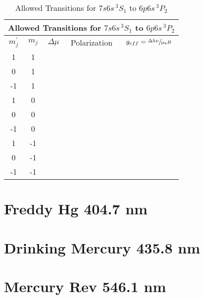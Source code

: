 \documentclass{article}
\begin{document}
\begin{table}[H]
\begin{center}
\begin{tabular}{|c|c|c|c|c|}
\hline
\multicolumn{5}{|c|}{Allowed Transitions for $7s6s\,^3S_1$ to $6p6s\,^3P_2$} \\
\hline 
$m_j^{\prime}$ & $m_j$ & $\Delta\mu$ & Polarization & $g_{eff} = \sfrac{\Delta h \nu}{\mu_bB}$ \\
\hline
1& 1&&&\\
0 & 1&&&\\ 
-1 & 1&&&\\
1& 0&&&\\ 
0& 0&&&\\ 
-1& 0&&&\\
1&-1&&&\\
0&-1&&&\\
-1&-1&&&\\
\hline
\end{tabular}
\caption{Allowed Transitions for $7s6s\,^3S_1$ to $6p6s\,^3P_2$}
\end{center}
\end{table}
  
 \section*{Freddy Hg 404.7 nm}
 
 \section*{Drinking Mercury 435.8 nm}
 
 \section*{Mercury Rev 546.1 nm}
\end{document}
